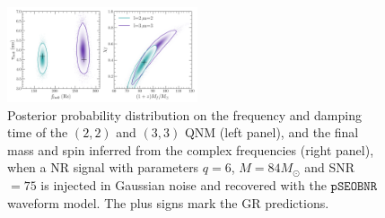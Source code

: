 \documentclass[twocolumn,prd,aps,superscriptaddress,preprintnumbers,tightenlines,showpacs,nofootinbib,eqsecnum,amsfonts,amsmath]{revtex4-1}
\newcommand{\Mo}{M_{\odot}}
\newcommand{\pSEOB}{\texttt{pSEOBNR}}
\begin{document}

\begin{figure}
        \includegraphics[width=0.5\textwidth]{figures/nohair_sxs_0166.png}
        \caption{Posterior probability distribution on the frequency and damping time of the $(2, 2)$ and $(3, 3)$ QNM (left panel), and the final mass and spin inferred from the complex frequencies (right panel), when a NR signal with parameters $q=6$,  $M=84 \Mo$ and SNR $=75$ is injected in Gaussian noise and recovered with the $\pSEOB$ waveform model. The plus signs mark the GR predictions.}
        \label{fig:nohair_sxs}
\end{figure}



\end{document}
